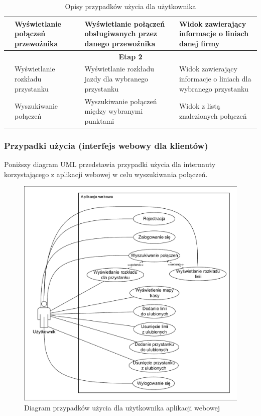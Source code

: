 \documentclass[10pt,a4paper]{article}
\begin{document}
\begin{table}[H]
\begin{tabularx}{\textwidth}{|c|X|X|X|}
		\cline{2-4}
		& Wyświetlanie połączeń przewoźnika
		& Wyświetlanie połączeń obsługiwanych przez danego przewoźnika
		& Widok zawierający informacje o liniach danej firmy \\
		\hline
		\multicolumn{4}{|c|}{\textbf{Etap 2}} \\
		\hline
		\multirow{5}{*}{\rotatebox[origin=c]{90}{Pracownik}}
		& Wyświetlanie rozkładu przystanku
		& Wyświetlanie rozkładu jazdy dla wybranego przystanku
		& Widok zawierający informacje o liniach dla wybranego przystanku \\
		\cline{2-4}
		& Wyszukiwanie połączeń
		& Wyszukiwanie połączeń między wybranymi punktami
		& Widok z listą znalezionych połączeń \\
		\hline
	\end{tabularx}
	\caption{Opisy przypadków użycia dla użytkownika}
\end{table}

\newpage
\subsubsection{Przypadki użycia (interfejs webowy dla klientów)}
Poniższy diagram UML przedstawia przypadki użycia dla internauty korzystającego z aplikacji webowej w celu wyszukiwania połączeń.

\begin{figure}[H]
	\centering
	\includegraphics[width=12cm]{Resources/PDF/use-case-web.pdf}
	\caption{Diagram przypadków użycia dla użytkownika aplikacji webowej}
\end{figure}
\end{document}
